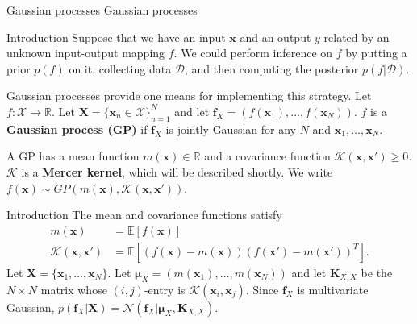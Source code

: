 \documentclass{beamer}
\begin{document}
\begin{frame}{Gaussian processes}
    Gaussian processes
\end{frame}

\begin{frame}{Introduction}
    Suppose that we have an input $\boldsymbol{x}$ and an  output $y$ related by an unknown input-output mapping $f$. We could perform inference on $f$ by putting a prior $p(f)$ on it, collecting data $\mathcal{D}$, and then computing the posterior $p(f | \mathcal{D})$.
    
    \medskip
    
    Gaussian processes provide one means for implementing this strategy. Let $f : \mathcal{X} \to \mathbb{R}$. Let $\boldsymbol{X} = \{\boldsymbol{x}_n \in \mathcal{X}\}_{n = 1}^N$ and let $\boldsymbol{f}_X = (f(\boldsymbol{x}_1), \ldots, f(\boldsymbol{x}_N))$. $f$ is a \textbf{Gaussian process (GP)} if $\boldsymbol{f}_X$ is jointly Gaussian for any $N$ and $\boldsymbol{x}_1, \ldots, \boldsymbol{x}_N$.
    
    \medskip
    
    A GP has a mean function $m(\boldsymbol{x}) \in \mathbb{R}$ and a covariance function $\mathcal{K}(\boldsymbol{x}, \boldsymbol{x}') \ge 0$. $\mathcal{K}$ is a \textbf{Mercer kernel}, which will be described shortly. We write $f(\boldsymbol{x}) \sim GP(m(\boldsymbol{x}), \mathcal{K}(\boldsymbol{x}, \boldsymbol{x}'))$.
\end{frame}

\begin{frame}{Introduction}
    The mean and covariance functions satisfy
    \begin{align*}
        m(\boldsymbol{x}) &= \mathbb{E}[f(\boldsymbol{x})] \\
        \mathcal{K}(\boldsymbol{x}, \boldsymbol{x}') &= \mathbb{E}[(f(\boldsymbol{x}) - m(\boldsymbol{x}))(f(\boldsymbol{x}') - m(\boldsymbol{x}'))^T].
    \end{align*}
    Let $\boldsymbol{X} = \{\boldsymbol{x}_1, \ldots, \boldsymbol{x}_N\}$. Let $\boldsymbol{\mu}_X = (m(\boldsymbol{x}_1), \ldots, m(\boldsymbol{x}_N))$ and let $\boldsymbol{K}_{X, X}$ be the $N \times N$ matrix whose $(i, j)$-entry is $\mathcal{K}(\boldsymbol{x}_i, \boldsymbol{x}_j)$. Since $\boldsymbol{f}_X$ is multivariate Gaussian, $p(\boldsymbol{f}_X | \boldsymbol{X}) = \mathcal{N}(\boldsymbol{f}_X | \boldsymbol{\mu}_X, \boldsymbol{K}_{X, X})$.
\end{frame}
\end{document}
